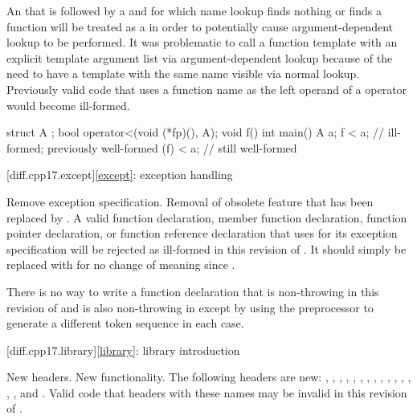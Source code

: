 \change
An 
that is followed by a \tcode{<}
and for which name lookup
finds nothing or finds a function
will be treated as a 
in order to potentially cause argument-dependent lookup to be performed.
\rationale
It was problematic to call a function template
with an explicit template argument list
via argument-dependent lookup
because of the need to have a template with the same name
visible via normal lookup.
\effect
Previously valid code that uses a function name
as the left operand of a \tcode{<} operator
would become ill-formed.
\begin{example}
\begin{codeblock}
struct A {};
bool operator<(void (*fp)(), A);
void f() {}
int main() {
  A a;
  f < a;    // ill-formed; previously well-formed
  (f) < a;  // still well-formed
}
\end{codeblock}
\end{example}

[diff.cpp17.except]{\ref*{except}: exception handling}

\change
Remove  exception specification.
\rationale
Removal of obsolete feature that has been replaced by .
\effect
A valid \CppXVII{} function declaration, member function declaration, function
pointer declaration, or function reference declaration that uses 
for its exception specification will be rejected as ill-formed in this
revision of \Cpp{}. It should simply be replaced with  for no
change of meaning since \CppXVII{}.
\begin{note}
There is no way to write a function declaration
that is non-throwing in this revision of \Cpp{}
and is also non-throwing in \CppIII{}
except by using the preprocessor to generate
a different token sequence in each case.
\end{note}

[diff.cpp17.library]{\ref*{library}: library introduction}

\change
New headers.
\rationale
New functionality.
\effect
The following \Cpp{} headers are new:
,
,
,
,
,
,
,
,
,
,
,
,
,
,
, and
.
Valid \CppXVII{} code that  headers with these names may be
invalid in this revision of \Cpp{}.

